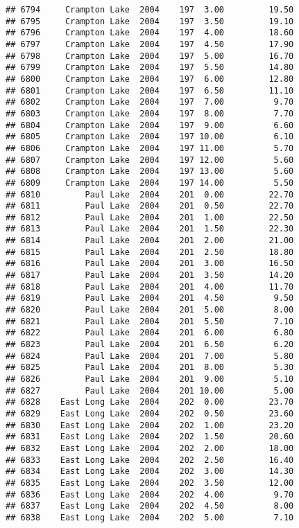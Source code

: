 \documentclass[
]{article}
\begin{document}
\begin{verbatim}
## 6794     Crampton Lake  2004    197  3.00         19.50
## 6795     Crampton Lake  2004    197  3.50         19.10
## 6796     Crampton Lake  2004    197  4.00         18.60
## 6797     Crampton Lake  2004    197  4.50         17.90
## 6798     Crampton Lake  2004    197  5.00         16.70
## 6799     Crampton Lake  2004    197  5.50         14.80
## 6800     Crampton Lake  2004    197  6.00         12.80
## 6801     Crampton Lake  2004    197  6.50         11.10
## 6802     Crampton Lake  2004    197  7.00          9.70
## 6803     Crampton Lake  2004    197  8.00          7.70
## 6804     Crampton Lake  2004    197  9.00          6.60
## 6805     Crampton Lake  2004    197 10.00          6.10
## 6806     Crampton Lake  2004    197 11.00          5.70
## 6807     Crampton Lake  2004    197 12.00          5.60
## 6808     Crampton Lake  2004    197 13.00          5.60
## 6809     Crampton Lake  2004    197 14.00          5.50
## 6810         Paul Lake  2004    201  0.00         22.70
## 6811         Paul Lake  2004    201  0.50         22.70
## 6812         Paul Lake  2004    201  1.00         22.50
## 6813         Paul Lake  2004    201  1.50         22.30
## 6814         Paul Lake  2004    201  2.00         21.00
## 6815         Paul Lake  2004    201  2.50         18.80
## 6816         Paul Lake  2004    201  3.00         16.50
## 6817         Paul Lake  2004    201  3.50         14.20
## 6818         Paul Lake  2004    201  4.00         11.70
## 6819         Paul Lake  2004    201  4.50          9.50
## 6820         Paul Lake  2004    201  5.00          8.00
## 6821         Paul Lake  2004    201  5.50          7.10
## 6822         Paul Lake  2004    201  6.00          6.80
## 6823         Paul Lake  2004    201  6.50          6.20
## 6824         Paul Lake  2004    201  7.00          5.80
## 6825         Paul Lake  2004    201  8.00          5.30
## 6826         Paul Lake  2004    201  9.00          5.10
## 6827         Paul Lake  2004    201 10.00          5.00
## 6828    East Long Lake  2004    202  0.00         23.70
## 6829    East Long Lake  2004    202  0.50         23.60
## 6830    East Long Lake  2004    202  1.00         23.20
## 6831    East Long Lake  2004    202  1.50         20.60
## 6832    East Long Lake  2004    202  2.00         18.00
## 6833    East Long Lake  2004    202  2.50         16.40
## 6834    East Long Lake  2004    202  3.00         14.30
## 6835    East Long Lake  2004    202  3.50         12.00
## 6836    East Long Lake  2004    202  4.00          9.70
## 6837    East Long Lake  2004    202  4.50          8.00
## 6838    East Long Lake  2004    202  5.00          7.10

\end{verbatim}
\end{document}
